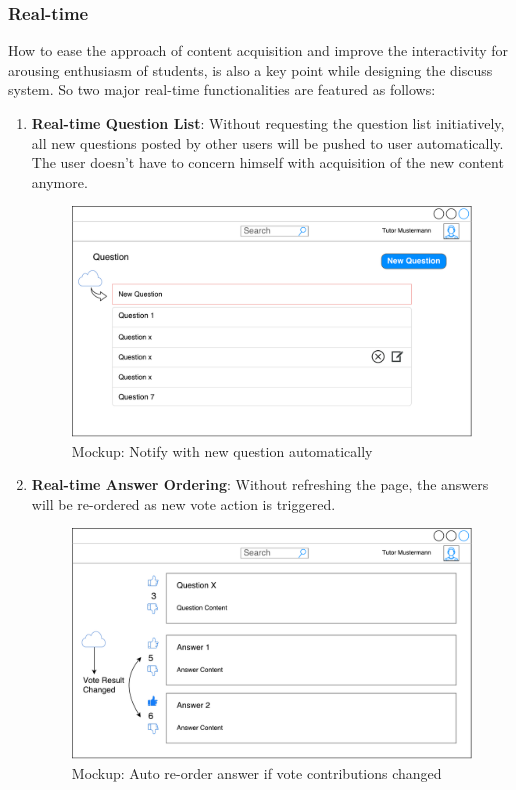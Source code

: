 \subsubsection{Real-time}
How to ease the approach of content acquisition and improve the interactivity for arousing enthusiasm of students, is also a key point while designing the discuss system. So two major real-time functionalities are featured as follows: 


\begin{enumerate}
\item
\textbf{Real-time Question List}: Without requesting the question list initiatively, all new questions posted by other users will be pushed to user automatically. The user doesn't have to concern himself with acquisition of the new content anymore.

\begin{figure}[!htbp]
  \centering
    \includegraphics[width=1\textwidth]{Figures/mockup/question-notify.pdf}
  \caption{Mockup: Notify with new question automatically}
\end{figure}

\item
\textbf{Real-time Answer Ordering}: Without refreshing the page, the answers will be re-ordered as new vote action is triggered.

\begin{figure}[!htbp]
  \centering
    \includegraphics[width=1\textwidth]{Figures/mockup/votechange.pdf}
  \caption{Mockup: Auto re-order answer if vote contributions changed}
\end{figure}


\end{enumerate}
